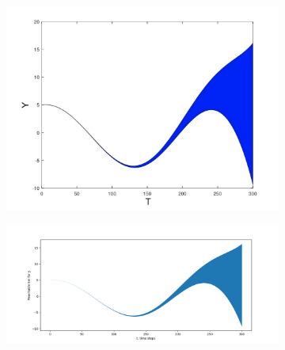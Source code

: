 \documentclass[EPiC]{easychair}
\begin{document}
\begin{figure}[h]
     \hspace{-15ex}  
    \begin{subfigure}{0.6\textwidth}
    \centering
    \includegraphics[width=\textwidth]{SapoFigures/Rosslert/SapoRosslerY.jpg}
    \end{subfigure}
    \hspace{-3ex}
    \begin{subfigure}{0.6\textwidth}
    \centering
    \includegraphics[width=1.4\textwidth,height=0.9\textwidth]{SapoFigures/Rosslert/KaaRosslerY.png}
    \end{subfigure}
  

\end{figure}
\end{document}
